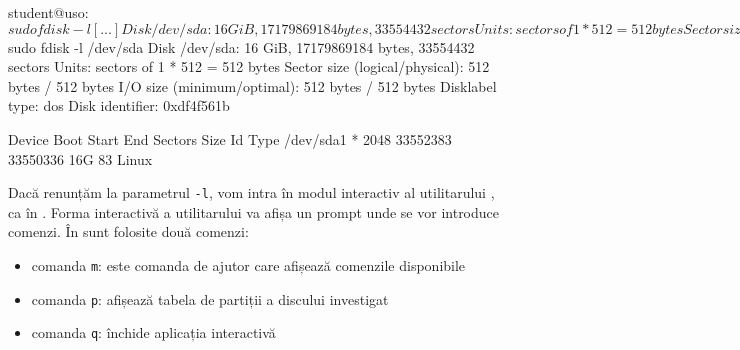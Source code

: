 \begin{screen}[caption={Afișarea partițiilor (fdisk)},label={lst:storage:fdisk-list}]
student@uso:~$ sudo fdisk -l
[...]
Disk /dev/sda: 16 GiB, 17179869184 bytes, 33554432 sectors
Units: sectors of 1 * 512 = 512 bytes
Sector size (logical/physical): 512 bytes / 512 bytes
I/O size (minimum/optimal): 512 bytes / 512 bytes
Disklabel type: dos
Disk identifier: 0xdf4f561b

Device     Boot Start      End  Sectors Size Id Type
/dev/sda1  *     2048 33552383 33550336  16G 83 Linux

Disk /dev/sdb: 2 GiB, 2147483648 bytes, 4194304 sectors
Units: sectors of 1 * 512 = 512 bytes
Sector size (logical/physical): 512 bytes / 512 bytes
I/O size (minimum/optimal): 512 bytes / 512 bytes

student@uso:~$ sudo fdisk -l /dev/sda
Disk /dev/sda: 16 GiB, 17179869184 bytes, 33554432 sectors
Units: sectors of 1 * 512 = 512 bytes
Sector size (logical/physical): 512 bytes / 512 bytes
I/O size (minimum/optimal): 512 bytes / 512 bytes
Disklabel type: dos
Disk identifier: 0xdf4f561b

Device     Boot Start      End  Sectors Size Id Type
/dev/sda1  *     2048 33552383 33550336  16G 83 Linux
\end{screen}

Dacă renunțăm la parametrul \texttt{-l}, vom intra în modul interactiv al utilitarului , ca în .
Forma interactivă a utilitarului va afișa un prompt unde se vor introduce comenzi.
În  sunt folosite două comenzi:
\begin{itemize}
  \item comanda \texttt{m}: este comanda de ajutor care afișează comenzile disponibile
  \item comanda \texttt{p}: afișează tabela de partiții a discului investigat
  \item comanda \texttt{q}: închide aplicația interactivă 
\end{itemize}

